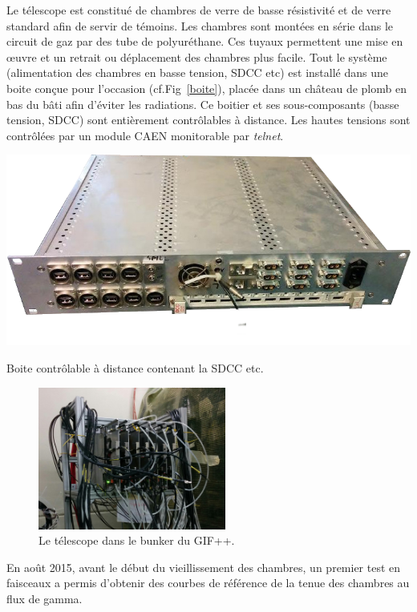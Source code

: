 Le télescope est constitué de chambres de verre de basse résistivité et de verre standard afin de servir de témoins. Les chambres sont montées en série dans le circuit de gaz par des tube de polyuréthane. Ces tuyaux permettent une mise en œuvre et un retrait ou déplacement des chambres plus facile. Tout le système (alimentation des chambres en basse tension, SDCC etc) est installé dans une boite conçue pour l'occasion (cf.Fig~\ref{boite}), placée dans un château de plomb en bas du bâti afin d'éviter les radiations. Ce boitier et ses sous-composants (basse tension, SDCC) sont entièrement contrôlables à distance. Les hautes tensions sont contrôlées par un module CAEN monitorable par \textit{telnet}.

\marginpar
{
	\centering
	\includegraphics[width=1.0\marginparwidth]{GLA/boite.png}
	\captionsetup{type=figure}\caption{Boite contrôlable à distance contenant la SDCC etc.}
	\label{boite}
}

\begin{figure}[!ht]
	\centering
	\includegraphics[width=0.55\textwidth]{GLA/GIFppChambers.png}
	\caption{Le télescope dans le bunker du GIF++.}
	\label{GIFppChambers}
\end{figure}

En août \num{2015}, avant le début du vieillissement des chambres, un premier test en faisceaux a permis d'obtenir des courbes de référence de la tenue des chambres au flux de gamma.

